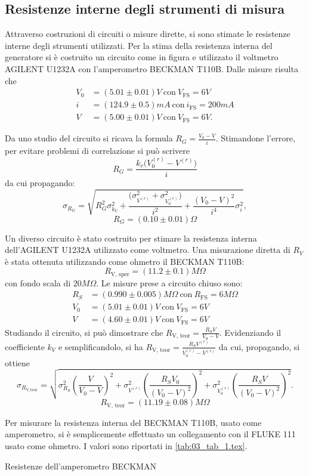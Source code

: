 \FloatBarrier
\subsection{Resistenze interne degli strumenti di misura}
Attraverso costruzioni di circuiti o misure dirette, si sono stimate le resistenze interne degli strumenti utilizzati.
Per la stima della resistenza interna del generatore si \`e costruito un circuito come in figura e utilizzato il voltmetro AGILENT U1232A con l'amperometro BECKMAN T110B.
Dalle misure risulta che
\begin{align}
V_0 &=(5.01 \pm 0.01 )V \ \textrm{con}\  V_{\textrm{FS}}=6V \\
i   &=(124.9 \pm 0.5) mA \ \textrm{con}\  i_{\textrm{FS}}=200mA \\
V   &=(5.00 \pm 0.01) V \ \textrm{con}\  V_{\textrm{FS}}=6V.
\end{align}

Da uno studio del circuito si ricava la formula $R_G=\frac{V_0-V}{i}$.
Stimandone l'errore, per evitare problemi di correlazione si pu\`o scrivere 
\[R_G=\frac{k_v \big(V_0^{(r)}- V^{(r)}\big)}{i}\] 
da cui propagando: 
\[\sigma_{R_G}=\sqrt{R_G^2 \sigma_{k_V}^2 + \frac{\Big(\sigma_{V^{(r)}}^2 + \sigma_{V_0^{(r)}}^2\Big)}{i^2} + \frac{(V_0-V)^2}{i^4} \sigma_i^2},\] \[R_G= (0.10 \pm 0.01) \Omega\]

Un diverso circuito \`e stato costruito per stimare la resistenza interna dell'AGILENT U1232A utilizzato come voltmetro.
Una misurazione diretta di $R_V$ \`e stata ottenuta utilizzando come ohmetro il BECKMAN T110B: \[R_{\textrm{V, sper}}=(11.2 \pm 0.1) M\Omega\] con fondo scala di $20 M\Omega$. 
Le misure prese a circuito chiuso sono: 
\begin{align}
R_S &= (0.990 \pm 0.005) M\Omega \ \textrm{con}\  R_{\textrm{FS}}=6 M\Omega \\
V_0 &= (5.01 \pm 0.01) V \ \textrm{con}\  V_{\textrm{FS}} = 6 V \\
V &= (4.60 \pm 0.01) V \ \textrm{con}\  V_{\textrm{FS}} = 6 V
\end{align}
Studiando il circuito, si pu\`o dimostrare che $ R_{\textrm{V, teor}} = \frac{R_S V}{V_0 - V}$.
Evidenziando il coefficiente $k_V$ e semplificandolo, si ha $R_{\textrm{V, teor}} = \frac{R_S V^{(r)}}{V_0^{(r)} - V^{(r)}}$ da cui, propagando, si ottiene 
\[\sigma_{R_{\textrm{V,teor}}} = \sqrt{\sigma_{R_S}^2 \left(\frac{V}{V_0 - V} \right)^2 + \sigma_{V^{(r)}}^2 \left(\frac{R_S V_0}{(V_0 - V)^2}\right)^2 + \sigma_{V_0^{(r)}}^2 \left(\frac{R_S V}{(V_0 - V)^2}\right)^2}.\]
\[R_{\textrm{V, teor}} = (11.19 \pm 0.08) M\Omega\]


Per misurare la resistenza interna del BECKMAN T110B, usato come amperometro, si \`e semplicemente effettuato un collegamento con il FLUKE 111 usato come ohmetro. I valori sono riportati in \autoref{tab:03_tab_1.tex}.

\begin{tabella}
	\centering
	
	\caption{Resistenze dell'amperometro BECKMAN}
	\label{tab:03_tab_1.tex}
\end{tabella}
